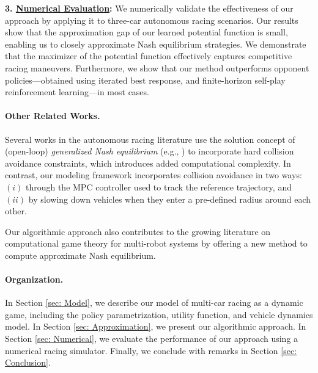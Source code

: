 \noindent \textbf{3. \underline{Numerical Evaluation}:} We numerically validate the effectiveness of our approach by applying it to three-car autonomous racing scenarios. Our results show that the approximation gap of our learned potential function is small, enabling us to closely approximate Nash equilibrium strategies. We demonstrate that the maximizer of the potential function effectively captures competitive racing maneuvers. Furthermore, we show that our method outperforms opponent policies—obtained using iterated best response, and finite-horizon self-play reinforcement learning—in most cases.

\paragraph{Other Related Works.} Several works in the autonomous racing literature use the solution concept of (open-loop) \textit{generalized Nash equilibrium} (e.g., \citep{wang2019bgame, jia2023rapid}) to incorporate hard collision avoidance constraints, which introduces added computational complexity. {In contrast, our modeling framework incorporates collision avoidance in two ways: \((i)\) through the MPC controller used to track the reference trajectory, and \((ii)\) by slowing down vehicles when they enter a pre-defined radius around each other.}

Our algorithmic approach also contributes to the growing literature on computational game theory for multi-robot systems \citep{laine2021multi, cleac2019algames, fridovich2020efficient, liu2023learning, peters2024contingency, kavuncu2021potential, sadigh2016planning, wang2020game} by offering a new method to compute approximate Nash equilibrium.

\paragraph{Organization.} In Section \ref{sec: Model}, we describe our model of multi-car racing as a dynamic game, including the policy parametrization, utility function, and vehicle dynamics model. In Section \ref{sec: Approximation}, we present our algorithmic approach. In Section \ref{sec: Numerical}, we evaluate the performance of our approach using a numerical racing simulator. Finally, we conclude with remarks in Section \ref{sec: Conclusion}.


